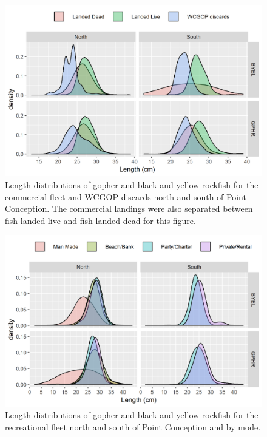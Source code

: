 \documentclass[12pt,]{article}
\begin{document}
\FloatBarrier

\begin{figure}
\centering
\includegraphics{Figures/Comm_lengths_justification.png}
\caption{Length distributions of gopher and black-and-yellow rockfish
for the commercial fleet and WCGOP discards north and south of Point
Conception. The commercial landings were also separated between fish
landed live and fish landed dead for this figure.
\label{fig:Comm_lengths_justification}}
\end{figure}

\FloatBarrier

\begin{figure}
\centering
\includegraphics{Figures/Rec_lengths_justification.png}
\caption{Length distributions of gopher and black-and-yellow rockfish
for the recreational fleet north and south of Point Conception and by
mode. \label{fig:Rec_lengths_justification}}
\end{figure}
\end{document}
